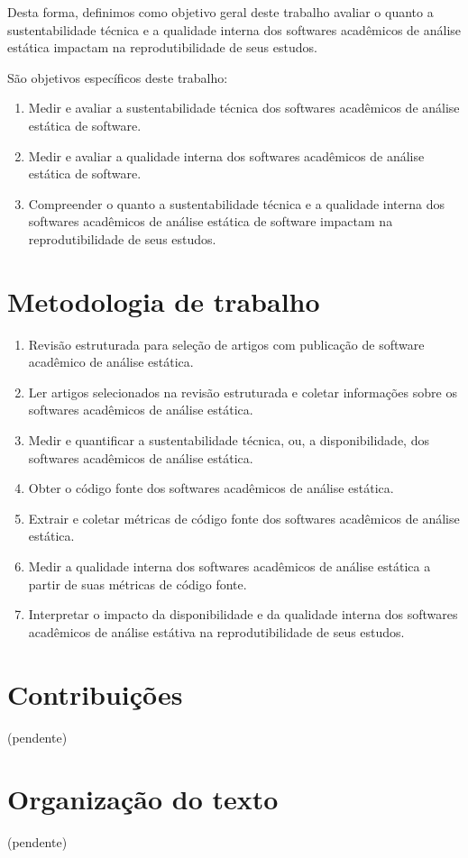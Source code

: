 Desta forma, definimos como objetivo geral deste trabalho avaliar o quanto a
sustentabilidade técnica e a qualidade interna dos softwares acadêmicos de
análise estática impactam na reprodutibilidade de seus estudos.

São objetivos específicos deste trabalho:

\begin{enumerate}
  \item Medir e avaliar a sustentabilidade técnica dos softwares acadêmicos de
        análise estática de software.
  \item Medir e avaliar a qualidade interna dos softwares acadêmicos de análise
        estática de software.
  \item Compreender o quanto a sustentabilidade técnica e a qualidade interna
        dos softwares acadêmicos de análise estática de software impactam na
        reprodutibilidade de seus estudos.
\end{enumerate}

\section{Metodologia de trabalho}

\begin{enumerate}
  \item Revisão estruturada para seleção de artigos com publicação de software
        acadêmico de análise estática.
  \item Ler artigos selecionados na revisão estruturada e coletar informações sobre
        os softwares acadêmicos de análise estática.
  \item Medir e quantificar a sustentabilidade técnica, ou, a disponibilidade, dos
        softwares acadêmicos de análise estática.
  \item Obter o código fonte dos softwares acadêmicos de análise estática.
  \item Extrair e coletar métricas de código fonte dos softwares acadêmicos de
        análise estática.
  \item Medir a qualidade interna dos softwares acadêmicos de análise estática
        a partir de suas métricas de código fonte.
  \item Interpretar o impacto da disponibilidade e da qualidade interna dos softwares
        acadêmicos de análise estátiva na reprodutibilidade de seus estudos.
\end{enumerate}

\section{Contribuições}

(pendente)

\section{Organização do texto}

(pendente)
